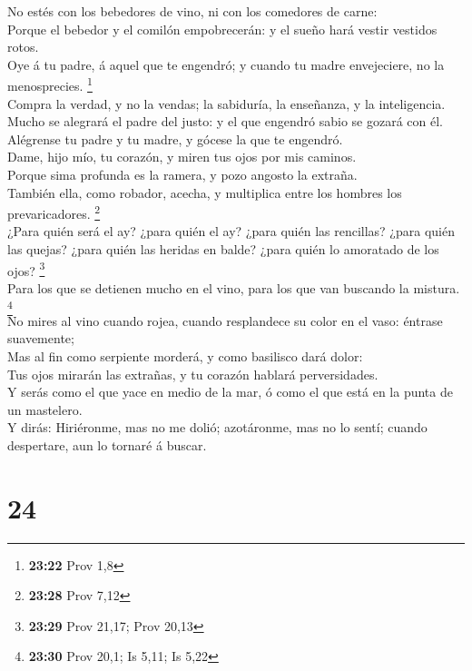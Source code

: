  No estés con los bebedores de vino, ni con los comedores
de carne:\\
 Porque el bebedor y el comilón empobrecerán: y el sueño
hará vestir vestidos rotos.\\
 Oye á tu padre, á aquel que te engendró; y cuando tu madre
envejeciere, no la menosprecies. \footnote{\textbf{23:22} Prov 1,8}\\
 Compra la verdad, y no la vendas; la sabiduría, la
enseñanza, y la inteligencia.\\
 Mucho se alegrará el padre del justo: y el que engendró
sabio se gozará con él.\\
 Alégrense tu padre y tu madre, y gócese la que te
engendró.\\
 Dame, hijo mío, tu corazón, y miren tus ojos por mis
caminos.\\
 Porque sima profunda es la ramera, y pozo angosto la
extraña.\\
 También ella, como robador, acecha, y multiplica entre los
hombres los prevaricadores. \footnote{\textbf{23:28} Prov 7,12}\\
 ¿Para quién será el ay? ¿para quién el ay? ¿para quién las
rencillas? ¿para quién las quejas? ¿para quién las heridas en balde?
¿para quién lo amoratado de los ojos? \footnote{\textbf{23:29} Prov
  21,17; Prov 20,13}\\
 Para los que se detienen mucho en el vino, para los que
van buscando la mistura. \footnote{\textbf{23:30} Prov 20,1; Is 5,11; Is
  5,22}\\
 No mires al vino cuando rojea, cuando resplandece su color
en el vaso: éntrase suavemente;\\
 Mas al fin como serpiente morderá, y como basilisco dará
dolor:\\
 Tus ojos mirarán las extrañas, y tu corazón hablará
perversidades.\\
 Y serás como el que yace en medio de la mar, ó como el que
está en la punta de un mastelero.\\
 Y dirás: Hiriéronme, mas no me dolió; azotáronme, mas no
lo sentí; cuando despertare, aun lo tornaré á buscar.

\hypertarget{section-23}{%
\section{24}\label{section-23}}

